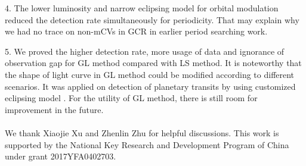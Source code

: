 \documentclass[fleqn,usenatbib]{mnras}
\begin{document}
4. The lower luminosity and narrow eclipsing model for orbital modulation reduced the detection rate simultaneously for periodicity. That may explain why we had no trace on non-mCVs in GCR in earlier period searching work.

5. We proved the higher detection rate, more usage of data and ignorance of observation gap for GL method compared with LS method. It is noteworthy that the shape of light curve in GL method could be modified according to different scenarios. It was applied on detection of planetary transits by using customized eclipsing model \citep{2002A&A...395..625A}. For the utility of GL method, there is still room for improvement in the future.
\\
\\

We thank Xiaojie Xu and Zhenlin Zhu for helpful discussions. This work is supported by the National Key Research and Development Program of China under grant 2017YFA0402703.



{}

\appendix
\end{document}
